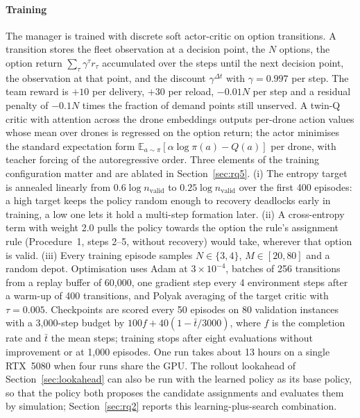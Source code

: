 \documentclass[final,5p,times,twocolumn]{elsarticle}
\begin{document}
\paragraph{Training}
The manager is trained with discrete soft actor-critic \cite{haarnoja2018} on option
transitions. A transition stores the fleet observation at a decision point, the $N$ options,
the option return $\sum_{\tau} \gamma^{\tau} r_{\tau}$ accumulated over the steps until the next
decision point, the observation at that point, and the discount $\gamma^{\Delta t}$ with
$\gamma = 0.997$ per step. The team reward is $+10$ per delivery, $+30$ per reload, $-0.01N$
per step and a residual penalty of $-0.1N$ times the fraction of demand points still unserved.
A twin-Q critic with attention across the drone embeddings outputs per-drone action values whose
mean over drones is regressed on the option return; the actor minimises the standard expectation
form $\mathbb{E}_{a \sim \pi}[\alpha \log \pi(a) - Q(a)]$ per drone, with teacher forcing of
the autoregressive order. Three elements of the training configuration matter and are ablated in
Section~\ref{sec:rq5}. (i) The entropy target is annealed linearly from $0.6 \log
n_{\mathrm{valid}}$ to $0.25 \log n_{\mathrm{valid}}$ over the first 400 episodes: a high
target keeps the policy random enough to recovery deadlocks early in training, a low one lets it
hold a multi-step formation later. (ii) A cross-entropy term with weight 2.0 pulls the policy
towards the option the rule's assignment rule (Procedure~1, steps 2--5, without recovery)
would take, wherever that option is valid. (iii) Every training episode samples $N \in
\{3,4\}$, $M \in [20,80]$ and a random depot. Optimisation uses Adam at $3 \times 10^{-4}$,
batches of 256 transitions from a replay buffer of 60{,}000, one gradient step every 4
environment steps after a warm-up of 400 transitions, and Polyak averaging of the target critic
with $\tau = 0.005$. Checkpoints are scored every 50 episodes on 80 validation instances with a
3{,}000-step budget by $100f + 40(1 - \bar t/3000)$, where $f$ is the completion rate and $\bar
t$ the mean steps; training stops after eight evaluations without improvement or at 1{,}000
episodes. One run takes about 13 hours on a single RTX~5080 when four runs share the GPU.
The rollout lookahead of Section~\ref{sec:lookahead} can also be run with the learned policy as its
base policy, so that the policy both proposes the candidate assignments and evaluates them by
simulation; Section~\ref{sec:rq2} reports this learning-plus-search combination.
\end{document}
